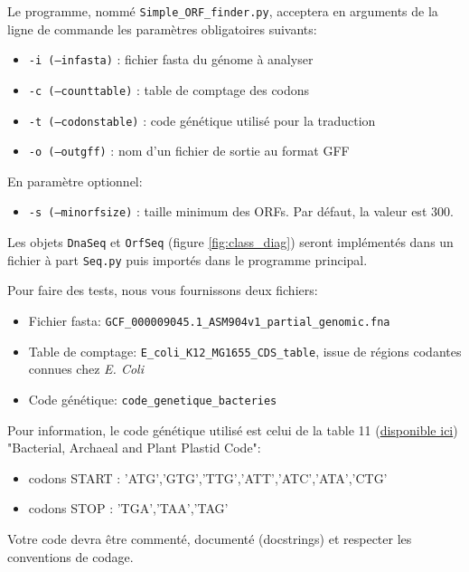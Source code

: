 \documentclass[10pt]{article}
\begin{document}
Le programme, nommé {\tt Simple\_ORF\_finder.py},  acceptera en arguments de la ligne de commande les paramètres obligatoires suivants: 
\begin{itemize}
\item {\tt -i (--infasta)} : fichier fasta du génome à analyser 
\item {\tt -c (--counttable)} : table de comptage des codons 
\item {\tt -t (--codonstable)} : code génétique utilisé pour la traduction
\item{\tt  -o (--outgff)} : nom d'un fichier de sortie au format GFF
\end{itemize}
En paramètre optionnel:
\begin{itemize}
\item {\tt -s (--minorfsize)} : taille minimum des ORFs. Par défaut, la valeur est 300.   
\end{itemize}

Les objets {\tt DnaSeq} et {\tt OrfSeq} (figure \ref{fig:class_diag}) seront implémentés dans un fichier à part {\tt Seq.py} puis importés dans le programme principal.

Pour faire des tests, nous vous fournissons deux fichiers:
\begin{itemize}
    \item Fichier fasta: {\tt GCF\_000009045.1\_ASM904v1\_partial\_genomic.fna}
    \item Table de comptage: {\tt E\_coli\_K12\_MG1655\_CDS\_table}, issue de régions codantes connues chez {\em E. Coli}
    \item Code génétique: {\tt code\_genetique\_bacteries}  %
\end{itemize}

Pour information, le code génétique utilisé est celui de la table 11 (\href{https://www.ncbi.nlm.nih.gov/Taxonomy/Utils/wprintgc.cgi}{disponible ici}) "Bacterial, Archaeal and Plant Plastid Code":

\begin{itemize}
    \item codons START : 'ATG','GTG','TTG','ATT','ATC','ATA','CTG'
    \item codons STOP : 'TGA','TAA','TAG'
\end{itemize}

Votre code devra être commenté, documenté (docstrings) et respecter les conventions de codage.
\end{document}
